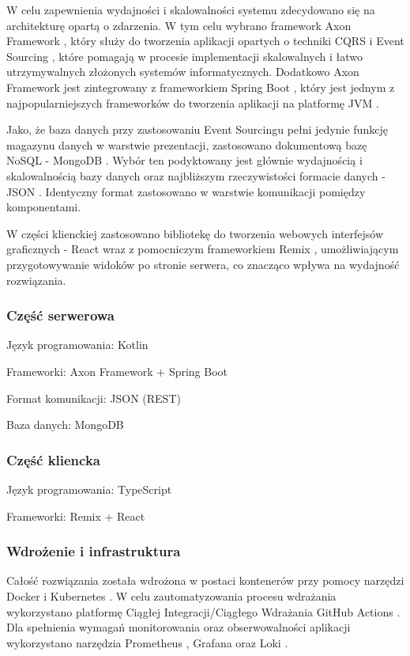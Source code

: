 W celu zapewnienia wydajności i skalowalności systemu zdecydowano się na architekturę opartą o zdarzenia. W tym celu wybrano framework Axon Framework \cite{axonframework}, który służy do tworzenia aplikacji opartych o techniki CQRS \cite{cqrs} i Event Sourcing \cite{eventsourcing}, które pomagają w procesie implementacji skalowalnych i łatwo utrzymywalnych złożonych systemów informatycznych. Dodatkowo Axon Framework jest zintegrowany z frameworkiem Spring Boot \cite{springboot}, który jest jednym z najpopularniejszych frameworków do tworzenia aplikacji na platformę JVM \cite{jvm}.

Jako, że baza danych przy zastosowaniu Event Sourcingu pełni jedynie funkcję magazynu danych w warstwie prezentacji, zastosowano dokumentową bazę NoSQL \cite{nosql} - MongoDB \cite{mongodb}. Wybór ten podyktowany jest głównie wydajnością i skalowalnością bazy danych oraz najbliższym rzeczywistości formacie danych - JSON \cite{json}. Identyczny format zastosowano w warstwie komunikacji pomiędzy komponentami.

W części klienckiej zastosowano bibliotekę do tworzenia webowych interfejsów graficznych - React \cite{react} wraz z pomocniczym frameworkiem Remix \cite{remix}, umożliwiającym przygotowywanie widoków po stronie serwera, co znacząco wpływa na wydajność rozwiązania.

\subsubsection{Część serwerowa}

Język programowania: Kotlin \cite{kotlin}

Frameworki: Axon Framework + Spring Boot

Format komunikacji: JSON (REST)

Baza danych: MongoDB

\subsubsection{Część kliencka}

Język programowania: TypeScript

Frameworki: Remix + React

\subsubsection{Wdrożenie i infrastruktura}

Całość rozwiązania została wdrożona w postaci kontenerów przy pomocy narzędzi Docker \cite{docker} i Kubernetes \cite{kubernetes}. W celu zautomatyzowania procesu wdrażania wykorzystano platformę Ciągłej Integracji/Ciągłego Wdrażania GitHub Actions \cite{githubactions}. Dla spełnienia wymagań monitorowania oraz obserwowalności aplikacji wykorzystano narzędzia Prometheus \cite{prometheus}, Grafana \cite{grafana} oraz Loki \cite{loki}.


